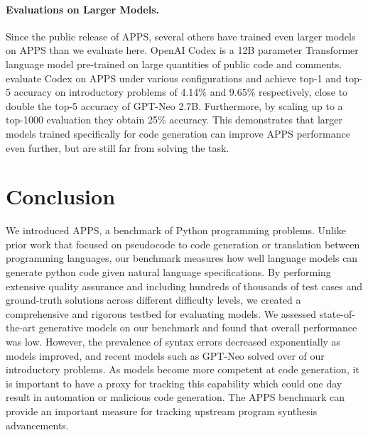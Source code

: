 \documentclass{article}
\begin{document}
\paragraph{Evaluations on Larger Models.}
Since the public release of APPS, several others have trained even larger models on APPS than we evaluate here. OpenAI Codex is a 12B parameter Transformer language model pre-trained on large quantities of public code and comments. \citet{chen2021evaluating} evaluate Codex on APPS under various configurations and achieve top-1 and top-5 accuracy on introductory problems of 4.14\% and 9.65\% respectively, close to double the top-5 accuracy of GPT-Neo 2.7B. Furthermore, by scaling up to a top-1000 evaluation they obtain 25\% accuracy. This demonstrates that larger models trained specifically for code generation can improve APPS performance even further, but are still far from solving the task. \section{Conclusion}
We introduced APPS, a benchmark of  Python programming problems. Unlike prior work that focused on pseudocode to code generation or translation between programming languages, our benchmark measures how well language models can generate python code given natural language specifications. By performing extensive quality assurance and including hundreds of thousands of test cases and ground-truth solutions across different difficulty levels, we created a comprehensive and rigorous testbed for evaluating models. We assessed state-of-the-art generative models on our benchmark and found that overall performance was low. However, the prevalence of syntax errors decreased exponentially as models improved, and recent models such as GPT-Neo solved over  of our introductory problems. As models become more competent at code generation, it is important to have a proxy for tracking this capability which could one day result in automation or malicious code generation. The APPS benchmark can provide an important measure for tracking upstream program synthesis advancements.


 






\newpage

\appendix
\end{document}
